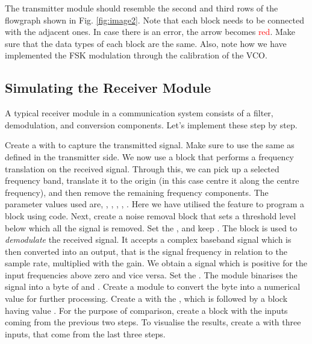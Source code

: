 \documentclass[11pt]{article}
\begin{document}
The transmitter module should resemble the second and third rows of the flowgraph shown in Fig. \ref{fig:image2}. Note that each block needs to be connected with the adjacent ones. In case there is an error, the arrow becomes \textcolor{red}{red}. Make sure that the data types of each block are the same. Also, note how we have implemented the FSK modulation through the calibration of the VCO.


\subsection{Simulating the Receiver Module}

A typical receiver module in a communication system consists of a filter, demodulation, and conversion components. Let's implement these step by step.

\begin{outline}[enumerate]
  \1 Create a  with to capture the transmitted signal. Make sure to use the same  as defined in the transmitter side.
  \1 We now use a  block that performs a frequency translation on the received signal. Through this, we can pick up a selected frequency band, translate it to the origin (in this case centre it along the centre frequency), and then remove the remaining frequency components. The parameter values used are, , , \newline {}, \newline {}, . Here we have utilised the feature to program a block using  code.
  \1 Next, create a noise removal  block that sets a threshold level below which all the signal is removed. Set the \newline {}, and keep .
  \1 The  block is used to \textit{demodulate} the received signal. It accepts a complex baseband signal which is then converted into an output, that is the signal frequency in relation to the sample rate, multiplied with the gain. We obtain a signal which is positive for the input frequencies above zero and vice versa. Set the .
  \1 The  module binarises the signal into a byte of  and .
  \1 Create a  module to convert the byte into a numerical value for further processing.
  \1 Create a  with the , which is followed by a  block having value .
  \1 For the purpose of comparison, create a  block with the inputs coming from the previous two steps.
  \1 To visualise the results, create a  with three inputs, that come from the last three steps.
\end{outline}
\end{document}
